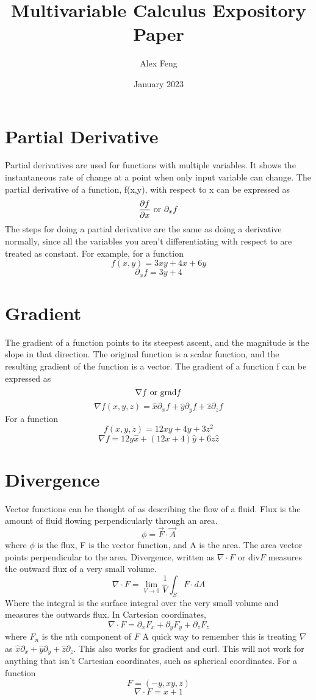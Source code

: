 \documentclass{article}
\title{Multivariable Calculus Expository Paper}
\author{Alex Feng}
\date{January 2023}
\begin{document}
\maketitle


\section{Partial Derivative}
    Partial derivatives are used for functions with multiple variables. It shows the instantaneous rate of change at a point when only input variable can change. The partial derivative of a function, f(x,y), with respect to x can be expressed as $$\frac{\partial f}{\partial x} \textnormal{ or } \partial_x f$$ 
    The steps for doing a partial derivative are the same as doing a derivative normally, since all the variables you aren't differentiating with respect to are treated as constant. For example, for a function $$f(x,y) = 3xy + 4x + 6y$$
    $$\partial_x f = 3y + 4$$
\section{Gradient}
    The gradient of a function points to its steepest ascent, and the magnitude is the slope in that direction. The original function is a scalar function, and the resulting gradient of the function is a vector. The gradient of a function f can be expressed as $$\nabla f \textnormal{ or} \textnormal{ grad}f$$
    $$\nabla f(x,y,z) = \hat{x} \partial_x f + \hat{y} \partial_y f + \hat{z} \partial_z f$$
    For a function
    $$f(x,y,z) = 12xy  + 4y + 3z^2$$
    $$\nabla f = 12y \hat{x} + (12x+4)\hat{y} + 6z\hat{z}$$    
\section{Divergence}
    Vector functions can be thought of as describing the flow of a fluid. Flux is the amount of fluid flowing perpendicularly through an area. 
    $$\phi = \vec{F} \cdot \vec{A}$$
    where $\phi$ is the flux, F is the vector function, and A is the area. The area vector points perpendicular to the area. Divergence, written as $\nabla \cdot F$ or div$F$ measures the outward flux of a very small volume. 
    $$\nabla \cdot F = \lim_{V \to 0} \frac{1}{V} \int_S F \cdot dA$$
    Where the integral is the surface integral over the very small volume and measures the outwards flux. In Cartesian coordinates, 
    $$\nabla \cdot F = \partial_x F_x + \partial_y F_y + \partial_z F_z$$
    where $F_n$ is the nth component of $F$
    A quick way to remember this is treating $\nabla$ as $\hat{x}\partial_x + \hat{y}\partial_y + \hat{z}\partial_z$. This also works for gradient and curl. This will not work for anything that isn't Cartesian coordinates, such as spherical coordinates. For a function 
    $$F = (-y, xy, z)$$
    $$\nabla \cdot F = x + 1$$
\end{document}
